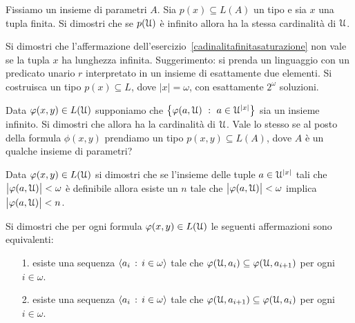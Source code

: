 \begin{exercise}\label{cadinalitafinitasaturazione}
Fissiamo un insieme di parametri $A$. Sia $p(x)\subseteq L(A)$ un tipo e sia $x$ una tupla finita. Si dimostri che se $p(\EuScript U)$ \`e infinito allora ha la stessa cardinalit\`a di $\EuScript U$.\QED 
\end{exercise}

\begin{exercise}
Si dimostri che l'affermazione dell'esercizio~\ref{cadinalitafinitasaturazione} non vale se la tupla $x$ ha lunghezza infinita. Suggerimento: si prenda un linguaggio con un predicato unario $r$ interpretato in un insieme di esattamente due elementi. Si costruisca un tipo $p(x)\subseteq L$, dove $|x|=\omega$, con esattamente $2^\omega$ soluzioni.\QED 
\end{exercise}

\begin{exercise}\label{cadinalitafinitasaturazioneinsiemi}
Data $\varphi(x,y)\in L(\EuScript U)$ supponiamo che $\big\{\varphi(a,\EuScript U)\ :\ a\in\EuScript U^{|x|}\big\}$ sia un insieme infinito. Si dimostri che allora ha la cardinalit\`a di $\EuScript U$. Vale lo stesso se al posto della formula $\phi(x,y)$ prendiamo un tipo $p(x,y)\subseteq L(A)$, dove $A$ \`e un qualche insieme di parametri? \QED 
\end{exercise}

\begin{exercise}\label{exgrptor}
Data $\varphi(x,y)\in L(\EuScript U)$ si dimostri che se l'insieme delle tuple $a\in\EuScript U^{|x|}$ tali che $\big|\varphi(a,\EuScript U)\big|<\omega$ \`e definibile allora esiste un $n$ tale che $\big|\varphi(a,\EuScript U)\big|<\omega$ implica $\big|\varphi(a,\EuScript U)\big|<n$.\QED 
\end{exercise}

\begin{exercise} 
Si dimostri che per ogni formula $\varphi(x,y)\in L(\EuScript U)$ le seguenti affermazioni sono equivalenti:
\begin{itemize}
\item[1.] esiste una sequenza $\langle a_i\,:\,i\in\omega\rangle$ tale che $\varphi(\EuScript U,a_i)\subseteq\varphi(\EuScript U,a_{i+1})$ per ogni $i\in\omega$. 
\item[2.] esiste una sequenza $\langle a_i\,:\,i\in\omega\rangle$ tale che $\varphi(\EuScript U,a_{i+1})\subseteq\varphi(\EuScript U,a_i)$ per ogni $i\in\omega$.\QED  
\end{itemize}
\end{exercise}


